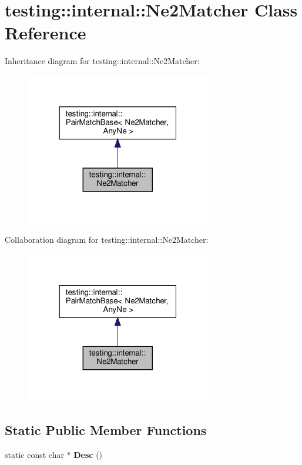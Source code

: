 \hypertarget{classtesting_1_1internal_1_1_ne2_matcher}{}\section{testing\+:\+:internal\+:\+:Ne2\+Matcher Class Reference}
\label{classtesting_1_1internal_1_1_ne2_matcher}


Inheritance diagram for testing\+:\+:internal\+:\+:Ne2\+Matcher\+:
\nopagebreak
\begin{figure}[H]
\begin{center}
\leavevmode
\includegraphics[width=229pt]{classtesting_1_1internal_1_1_ne2_matcher__inherit__graph}
\end{center}
\end{figure}


Collaboration diagram for testing\+:\+:internal\+:\+:Ne2\+Matcher\+:
\nopagebreak
\begin{figure}[H]
\begin{center}
\leavevmode
\includegraphics[width=229pt]{classtesting_1_1internal_1_1_ne2_matcher__coll__graph}
\end{center}
\end{figure}
\subsection*{Static Public Member Functions}
\begin{DoxyCompactItemize}
\item 
\mbox{\label{classtesting_1_1internal_1_1_ne2_matcher_a4a387f6ef1d20caf53911ef91c0f39f1}} 
static const char $\ast$ {\bfseries Desc} ()
\end{DoxyCompactItemize}
